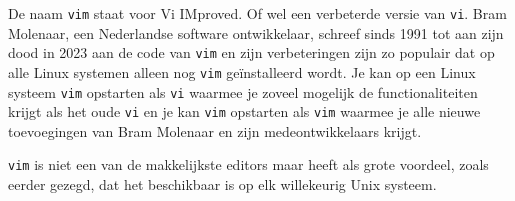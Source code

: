 De naam \texttt{vim} staat voor Vi IMproved. Of wel een verbeterde versie van \texttt{vi}. Bram Molenaar, een Nederlandse software ontwikkelaar, schreef sinds 1991 tot aan zijn dood in 2023 aan de code van \texttt{vim} en zijn verbeteringen zijn zo populair dat op alle Linux systemen alleen nog \texttt{vim} ge\"installeerd wordt. Je kan op een Linux systeem \texttt{vim} opstarten als \texttt{vi} waarmee je zoveel mogelijk de functionaliteiten krijgt als het oude \texttt{vi} en je kan \texttt{vim} opstarten als \texttt{vim} waarmee je alle nieuwe toevoegingen van Bram Molenaar en zijn medeontwikkelaars krijgt.

\texttt{vim} is niet een van de makkelijkste editors maar heeft als grote voordeel, zoals eerder gezegd, dat het beschikbaar is op elk willekeurig Unix systeem.

